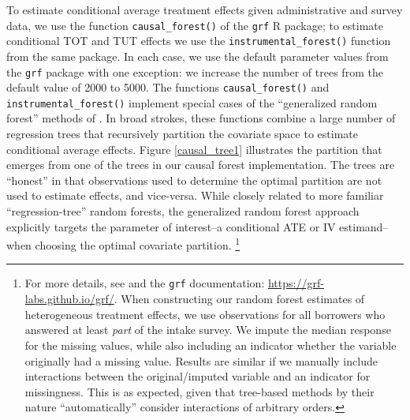 \documentclass[ecta,nameyear,final]{econsocart}
\begin{document}
To estimate conditional average treatment effects given administrative and survey data, we use the function \texttt{causal\_forest()} of the \texttt{grf} R package; to estimate conditional TOT and TUT effects we use the \texttt{instrumental\_forest()} function from the same package.
In each case, we use the default parameter values from the \texttt{grf} package with one exception: we increase the number of trees from the default value of 2000 to 5000.
The functions \texttt{causal\_forest()} and \texttt{instrumental\_forest()} implement special cases of the ``generalized random forest'' methods of \cite{atheygrf}.
In broad strokes, these functions combine a large number of regression trees that recursively partition the covariate space to estimate conditional average effects.
Figure \ref{causal_tree1} illustrates the partition that emerges from one of the trees in our causal forest implementation.
The trees are ``honest'' in that observations used to determine the optimal partition are not used to estimate effects, and vice-versa.
While closely related to more familiar ``regression-tree'' random forests, the generalized random forest approach explicitly targets the parameter of interest--a conditional ATE or IV estimand--when choosing the optimal covariate partition.
\footnote{For more details, see \cite{atheygrf} and the \texttt{grf} documentation: \url{https://grf-labs.github.io/grf/}. When constructing our random forest estimates of heterogeneous treatment effects, we use observations for all borrowers who answered at least \emph{part} of the intake survey.
We impute the median response for the missing values, while also including an indicator whether the variable originally had a missing value. Results are similar if we manually include interactions between the original/imputed variable and an indicator for missingness. This is as expected, given that tree-based methods by their nature ``automatically'' consider interactions of arbitrary orders.}
\end{document}
